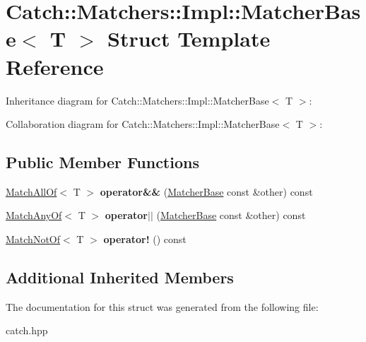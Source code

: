 \hypertarget{structCatch_1_1Matchers_1_1Impl_1_1MatcherBase}{}\section{Catch\+:\+:Matchers\+:\+:Impl\+:\+:Matcher\+Base$<$ T $>$ Struct Template Reference}
\label{structCatch_1_1Matchers_1_1Impl_1_1MatcherBase}


Inheritance diagram for Catch\+:\+:Matchers\+:\+:Impl\+:\+:Matcher\+Base$<$ T $>$\+:


Collaboration diagram for Catch\+:\+:Matchers\+:\+:Impl\+:\+:Matcher\+Base$<$ T $>$\+:
\subsection*{Public Member Functions}
\begin{DoxyCompactItemize}
\item 
\mbox{\label{structCatch_1_1Matchers_1_1Impl_1_1MatcherBase_a23c336f6d9457735ddc8dc7ea864d7c9}} 
\hyperlink{structCatch_1_1Matchers_1_1Impl_1_1MatchAllOf}{Match\+All\+Of}$<$ T $>$ {\bfseries operator\&\&} (\hyperlink{structCatch_1_1Matchers_1_1Impl_1_1MatcherBase}{Matcher\+Base} const \&other) const
\item 
\mbox{\label{structCatch_1_1Matchers_1_1Impl_1_1MatcherBase_a5f8542b8f1567a6f9c65d0a6da7b679b}} 
\hyperlink{structCatch_1_1Matchers_1_1Impl_1_1MatchAnyOf}{Match\+Any\+Of}$<$ T $>$ {\bfseries operator$\vert$$\vert$} (\hyperlink{structCatch_1_1Matchers_1_1Impl_1_1MatcherBase}{Matcher\+Base} const \&other) const
\item 
\mbox{\label{structCatch_1_1Matchers_1_1Impl_1_1MatcherBase_a5bb94bf2ff5c7ef73b7c11eb173bdf3b}} 
\hyperlink{structCatch_1_1Matchers_1_1Impl_1_1MatchNotOf}{Match\+Not\+Of}$<$ T $>$ {\bfseries operator!} () const
\end{DoxyCompactItemize}
\subsection*{Additional Inherited Members}


The documentation for this struct was generated from the following file\+:\begin{DoxyCompactItemize}
\item 
catch.\+hpp\end{DoxyCompactItemize}
